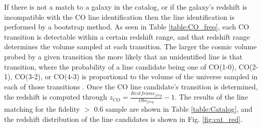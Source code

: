 If there is not a match to a galaxy in the catalog, or if the galaxy's redshift is incompatible with the CO line identification then the line identification is performed by a bootstrap method. As seen in Table \ref{table:CO_freq}, each CO transition is detectable within a certain redshift range, and that redshift range determines the volume sampled at each transition. The larger the cosmic volume probed by a given transition the more likely that an unidentified line is that transition, where the probability of a line candidate being one of CO(1-0), CO(2-1), CO(3-2), or CO(4-3) is proportional to the volume of the universe sampled in each of those transitions \cite{walter2016alma, decarli2019alma}. Once the CO line candidate's transition is determined, the redshift is computed through $ z_{CO} = \frac{Restframe_{freq}}{Obs_{freq}} - 1 $. The results of the line matching for the fidelity $>$ 0.6 sample are shown in Table \ref{table:Catalog}, and the redshift distribution of the line candidates is shown in Fig. \ref{fig:cat_red}.

